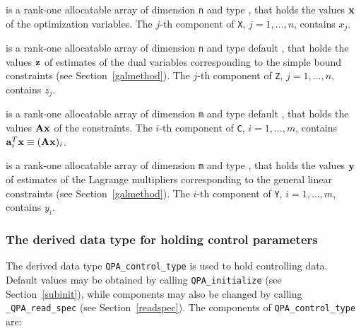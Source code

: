 \documentclass{galahad}
\newcommand{\packagename}{QPA}
\newcommand{\fullpackagename}{\libraryname\_\packagename}
\begin{document}
\begin{description}
 is a rank-one allocatable array of dimension {\tt n} and type 
\realdp, 
that holds the values ${\mathbf{x}}$ of the optimization variables.
The $j$-th component of {\tt X}, $j = 1,  \ldots , n$, contains $x_{j}$.  

 is a rank-one allocatable array of dimension {\tt n} and type default 
\realdp, that holds
the values ${\mathbf{z}}$ of estimates  of the dual variables 
corresponding to the simple bound constraints (see Section~\ref{galmethod}).
The $j$-th component of {\tt Z}, $j = 1,  \ldots ,  n$, contains $z_{j}$.  

 is a rank-one allocatable array of dimension {\tt m} and type default 
\realdp, that holds
the values ${\mathbf{A}} {\mathbf{x}}$ of the constraints.
The $i$-th component of {\tt C}, $i = 1,  \ldots ,  m$, contains 
${\mathbf{a}}_{i}^{T}{\mathbf{x}} \equiv ({\mathbf{A}} {\mathbf{x}})_{i}$.  

 is a rank-one allocatable array of dimension {\tt m} and type 
\realdp, that holds
the values ${\mathbf{y}}$ of estimates  of the Lagrange multipliers
corresponding to the general linear constraints (see Section~\ref{galmethod}).
The $i$-th component of {\tt Y}, $i = 1,  \ldots ,  m$, contains $y_{i}$.  

\end{description}


\subsubsection{The derived data type for holding control 
 parameters}\label{typecontrol}
The derived data type 
{\tt \packagename\_control\_type} 
is used to hold controlling data. Default values may be obtained by calling 
{\tt \packagename\_initialize}
(see Section~\ref{subinit}),
while components may also be changed by calling 
{\tt \fullpackagename\_read\-\_spec}
(see Section~\ref{readspec}). 
The components of 
{\tt \packagename\_control\_type} 
are:



\end{document}
